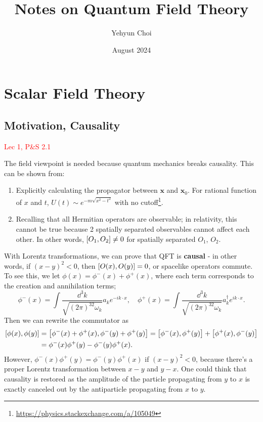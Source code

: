 \documentclass{article}
\title{Notes on Quantum Field Theory}
\author{Yehyun Choi}
\date{August 2024}
\begin{document}
\maketitle
\tableofcontents
\pagebreak


\section{Scalar Field Theory}
\subsection{Motivation, Causality}
\textcolor{red}{Lec 1, P\&S 2.1}

The field viewpoint is needed because quantum mechanics breaks causality. This can be shown from:
\begin{enumerate}
    \item Explicitly calculating the propagator between $\mathbf x$ and $\mathbf x_0$. For rational function of $x$ and $t$, $U(t)\sim e^{-m\sqrt{x^2-t^2}}$ with no cutoff\footnote{\url{https://physics.stackexchange.com/a/105049}}.
    \item Recalling that all Hermitian operators are observable; in relativity, this cannot be true because 2 spatially separated observables cannot affect each other. In other words, $\comm{O_1}{O_2}\ne 0$ for spatially separated $O_1$, $O_2$.
\end{enumerate}

With Lorentz transformations, we can prove that QFT is \textbf{causal} - in other words, if $(x-y)^2<0$, then $\comm{O(x)}{O(y)}=0$, or spacelike operators commute. To see this, we let $\phi(x)=\phi^-(x)+\phi^+(x)$, where each term corresponds to the creation and annihilation terms;
$$\phi^-(x)=\int\frac{\dd^3k}{\sqrt{(2\pi)^32\omega_k}}a_ke^{-ik\cdot x},\quad \phi^+(x)=\int\frac{\dd^3k}{\sqrt{(2\pi)^32\omega_k}}a^\dag_ke^{ik\cdot x}.$$
Then we can rewrite the commutator as 
\begin{align*}
    \comm{\phi(x)}{\phi(y)}&=\comm{\phi^-(x)+\phi^+(x)}{\phi^-(y)+\phi^+(y)}=\comm{\phi^-(x)}{\phi^+(y)}+\comm{\phi^+(x)}{\phi^-(y)}\\
    &=\phi^-(x)\phi^+(y)-\phi^-(y)\phi^+(x).
\end{align*}
However, $\phi^-(x)\phi^+(y)=\phi^-(y)\phi^+(x)$ if $(x-y)^2<0$, because there's a proper Lorentz transformation between $x-y$ and $y-x$. One could think that causality is restored as the amplitude of the particle propagating from $y$ to $x$ is exactly canceled out by the antiparticle propagating from $x$ to $y$. 
\end{document}

